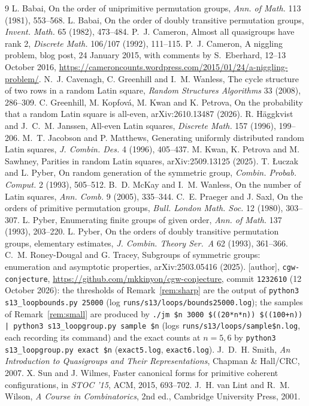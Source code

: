 \documentclass[11pt]{amsart}
\theoremstyle{plain}
\theoremstyle{remark}
\begin{document}
\begin{thebibliography}{9}
 L. Babai, On the order of uniprimitive permutation groups, \emph{Ann. of Math.} 113 (1981), 553--568.
 L. Babai, On the order of doubly transitive permutation groups, \emph{Invent. Math.} 65 (1982), 473--484.
 P.~J. Cameron, Almost all quasigroups have rank 2, \emph{Discrete Math.} 106/107 (1992), 111--115.
 P.~J. Cameron, A niggling problem, blog post, 24 January 2015, with comments by S.~Eberhard, 12--13 October 2016, \url{https://cameroncounts.wordpress.com/2015/01/24/a-niggling-problem/}.
 N.~J. Cavenagh, C. Greenhill and I.~M. Wanless, The cycle structure of two rows in a random Latin square, \emph{Random Structures Algorithms} 33 (2008), 286--309.
 C. Greenhill, M. Kopfov\'a, M. Kwan and K. Petrova, On the probability that a random Latin square is all-even, arXiv:2610.13487 (2026).
 R. H\"aggkvist and J.~C.~M. Janssen, All-even Latin squares, \emph{Discrete Math.} 157 (1996), 199--206.
 M.~T. Jacobson and P. Matthews, Generating uniformly distributed random Latin squares, \emph{J. Combin. Des.} 4 (1996), 405--437.
 M. Kwan, K. Petrova and M. Sawhney, Parities in random Latin squares, arXiv:2509.13125 (2025).
 T. {\L}uczak and L. Pyber, On random generation of the symmetric group, \emph{Combin. Probab. Comput.} 2 (1993), 505--512.
 B.~D. McKay and I.~M. Wanless, On the number of Latin squares, \emph{Ann. Comb.} 9 (2005), 335--344.
 C.~E. Praeger and J. Saxl, On the orders of primitive permutation groups, \emph{Bull. London Math. Soc.} 12 (1980), 303--307.
 L. Pyber, Enumerating finite groups of given order, \emph{Ann. of Math.} 137 (1993), 203--220.
 L. Pyber, On the orders of doubly transitive permutation groups, elementary estimates, \emph{J. Combin. Theory Ser.~A} 62 (1993), 361--366.
 C.~M. Roney-Dougal and G. Tracey, Subgroups of symmetric groups: enumeration and asymptotic properties, arXiv:2503.05416 (2025).
 [author], \texttt{cgw-conjecture}, \url{https://github.com/mkkinyon/cgw-conjecture}, commit \texttt{1232610} (12 October 2026): the thresholds of Remark~\ref{rem:sharp} are the output of \texttt{python3 s13\_loopbounds.py 25000} (log \texttt{runs/s13/loops/bounds25000.log}); the samples of Remark~\ref{rem:small} are produced by \texttt{./jm \$n 3000 \$((20*n*n)) \$((100+n)) | python3 s13\_loopgroup.py sample \$n} (logs \texttt{runs/s13/loops/sample\$n.log}, each recording its command) and the exact counts at $n=5,6$ by \texttt{python3 s13\_loopgroup.py exact \$n} (\texttt{exact5.log}, \texttt{exact6.log}).
 J.~D.~H. Smith, \emph{An Introduction to Quasigroups and Their Representations}, Chapman \& Hall/CRC, 2007.
 X. Sun and J. Wilmes, Faster canonical forms for primitive coherent configurations, in \emph{STOC '15}, ACM, 2015, 693--702.
 J.~H. van Lint and R.~M. Wilson, \emph{A Course in Combinatorics}, 2nd ed., Cambridge University Press, 2001.
\end{thebibliography}
\end{document}
